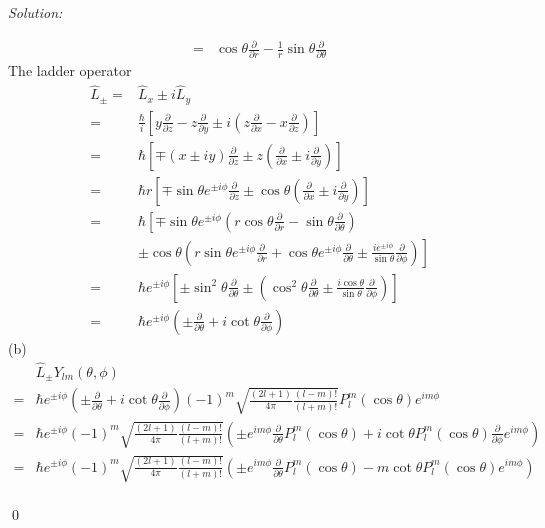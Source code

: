 \documentclass[12pt,a4paper]{article}
\newenvironment{sol}
    {\emph{Solution:}
    }
    {
    \qed
    }
\begin{document}
\begin{sol}
\begin{align}
=&\cos\theta\frac{\partial}{\partial r}-\frac{1}{r}\sin\theta\frac{\partial}{\partial\theta}
\end{align}
The ladder operator
\begin{align}
\nonumber\hat{L}_{\pm}=&\hat{L}_x\pm i\hat{L}_y\\
\nonumber=&\frac{\hbar}{i}\left[y\frac{\partial}{\partial z}-z\frac{\partial}{\partial y}\pm i\left(z\frac{\partial}{\partial x}-x\frac{\partial}{\partial z}\right)\right]\\
\nonumber=&\hbar\left[\mp(x\pm iy)\frac{\partial}{\partial z}\pm z\left(\frac{\partial}{\partial x}\pm i\frac{\partial}{\partial y}\right)\right]\\
\nonumber=&\hbar r\left[\mp\sin\theta e^{\pm i\phi}\frac{\partial}{\partial z}\pm\cos\theta\left(\frac{\partial}{\partial x}\pm i\frac{\partial}{\partial y}\right)\right]\\
\nonumber=&\hbar\left[\mp\sin\theta e^{\pm i\phi}\left(r\cos\theta\frac{\partial}{\partial r}-\sin\theta\frac{\partial}{\partial\theta}\right)\right.\\
\nonumber&\left.\pm\cos\theta\left(r\sin\theta e^{\pm i\phi}\frac{\partial}{\partial r}+\cos\theta e^{\pm i\phi}\frac{\partial}{\partial\theta}\pm\frac{ie^{\pm i\phi}}{\sin\theta}\frac{\partial}{\partial\phi}\right)\right]\\
\nonumber=&\hbar e^{\pm i\phi}\left[\pm\sin^2\theta\frac{\partial}{\partial\theta}\pm\left(\cos^2\theta\frac{\partial}{\partial\theta}\pm\frac{i\cos\theta}{\sin\theta}\frac{\partial}{\partial\phi}\right)\right]\\
=&\hbar e^{\pm i\phi}\left(\pm\frac{\partial}{\partial\theta}+i\cot\theta\frac{\partial}{\partial\phi}\right)
\end{align}
(b)
\begin{align}
\nonumber&\hat{L}_{\pm}Y_{lm}(\theta,\phi)\\
\nonumber=&\hbar e^{\pm i\phi}\left(\pm\frac{\partial}{\partial\theta}+i\cot\theta\frac{\partial}{\partial\phi}\right)(-1)^m\sqrt{\frac{(2l+1)}{4\pi}\frac{(l-m)!}{(l+m)!}}P_l^m(\cos\theta)e^{im\phi}\\
\nonumber=&\hbar e^{\pm i\phi}(-1)^m\sqrt{\frac{(2l+1)}{4\pi}\frac{(l-m)!}{(l+m)!}}\left(\pm e^{im\phi}\frac{\partial}{\partial\theta}P_l^m(\cos\theta)+i\cot\theta P_l^m(\cos\theta)\frac{\partial}{\partial\phi}e^{im\phi}\right)\\
\nonumber=&\hbar e^{\pm i\phi}(-1)^m\sqrt{\frac{(2l+1)}{4\pi}\frac{(l-m)!}{(l+m)!}}\left(\pm e^{im\phi}\frac{\partial}{\partial\theta}P_l^m(\cos\theta)-m\cot\theta P_l^m(\cos\theta)e^{im\phi}\right)\\

\end{align}
\end{sol}
\end{document}
